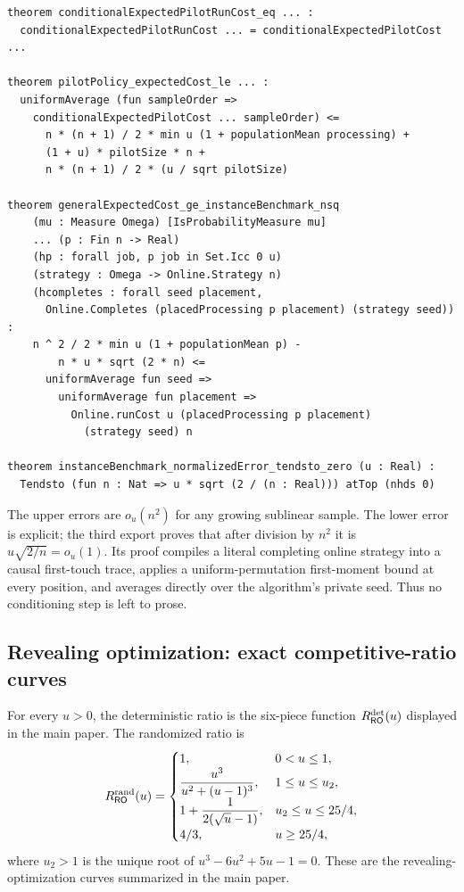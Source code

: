 \begin{lstlisting}[style=lean]
theorem conditionalExpectedPilotRunCost_eq ... :
  conditionalExpectedPilotRunCost ... = conditionalExpectedPilotCost ...

theorem pilotPolicy_expectedCost_le ... :
  uniformAverage (fun sampleOrder =>
    conditionalExpectedPilotCost ... sampleOrder) <=
      n * (n + 1) / 2 * min u (1 + populationMean processing) +
      (1 + u) * pilotSize * n +
      n * (n + 1) / 2 * (u / sqrt pilotSize)

theorem generalExpectedCost_ge_instanceBenchmark_nsq
    (mu : Measure Omega) [IsProbabilityMeasure mu]
    ... (p : Fin n -> Real)
    (hp : forall job, p job in Set.Icc 0 u)
    (strategy : Omega -> Online.Strategy n)
    (hcompletes : forall seed placement,
      Online.Completes (placedProcessing p placement) (strategy seed)) :
    n ^ 2 / 2 * min u (1 + populationMean p) -
        n * u * sqrt (2 * n) <=
      uniformAverage fun seed =>
        uniformAverage fun placement =>
          Online.runCost u (placedProcessing p placement)
            (strategy seed) n

theorem instanceBenchmark_normalizedError_tendsto_zero (u : Real) :
  Tendsto (fun n : Nat => u * sqrt (2 / (n : Real))) atTop (nhds 0)
\end{lstlisting}

The upper errors are $o_u(n^2)$ for any growing sublinear sample.  The lower
error is explicit; the third export proves that after division by $n^2$ it is
$u\sqrt{2/n}=o_u(1)$.  Its proof compiles a literal completing online
strategy into a causal first-touch trace, applies a uniform-permutation
first-moment bound at every position, and averages directly over the
algorithm's private seed.  Thus no conditioning step is left to prose.

\subsection{Revealing optimization: exact competitive-ratio curves}

\begin{theorem}
\label{thm:lean-audit-revealing-curves}
For every $u>0$, the deterministic ratio is the six-piece function
$R_{\mathsf{RO}}^{\mathrm{det}}(u)$ displayed in the main paper.  The randomized ratio is
\[
 R_{\mathsf{RO}}^{\mathrm{rand}}(u)=
 \begin{cases}
  1,&0<u\le1,\\
  \dfrac{u^3}{u^2+(u-1)^3},&1\le u\le u_2,\\
  1+\dfrac1{2(\sqrt u-1)},&u_2\le u\le25/4,\\
  4/3,&u\ge25/4,
 \end{cases}
\]
where $u_2>1$ is the unique root of
$u^3-6u^2+5u-1=0$.  These are the revealing-optimization curves summarized
in the main paper.
\end{theorem}

